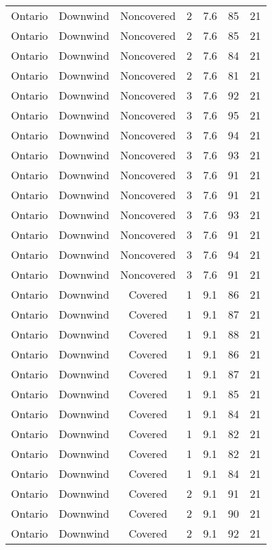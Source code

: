 \documentclass{article}
\begin{document}
\begin{longtable}[H]{ccccccc}
Ontario & Downwind & Noncovered & 2 & 7.6  & 85  & 21 \\
Ontario & Downwind & Noncovered & 2 & 7.6  & 85  & 21 \\
Ontario & Downwind & Noncovered & 2 & 7.6  & 84  & 21 \\
Ontario & Downwind & Noncovered & 2 & 7.6  & 81  & 21 \\
Ontario & Downwind & Noncovered & 3 & 7.6  & 92  & 21 \\
Ontario & Downwind & Noncovered & 3 & 7.6  & 95  & 21 \\
Ontario & Downwind & Noncovered & 3 & 7.6  & 94  & 21 \\
Ontario & Downwind & Noncovered & 3 & 7.6  & 93  & 21 \\
Ontario & Downwind & Noncovered & 3 & 7.6  & 91  & 21 \\
Ontario & Downwind & Noncovered & 3 & 7.6  & 91  & 21 \\
Ontario & Downwind & Noncovered & 3 & 7.6  & 93  & 21 \\
Ontario & Downwind & Noncovered & 3 & 7.6  & 91  & 21 \\
Ontario & Downwind & Noncovered & 3 & 7.6  & 94  & 21 \\
Ontario & Downwind & Noncovered & 3 & 7.6  & 91  & 21 \\
Ontario & Downwind & Covered     & 1 & 9.1  & 86  & 21 \\
Ontario & Downwind & Covered     & 1 & 9.1  & 87  & 21 \\
Ontario & Downwind & Covered     & 1 & 9.1  & 88  & 21 \\
Ontario & Downwind & Covered     & 1 & 9.1  & 86  & 21 \\
Ontario & Downwind & Covered     & 1 & 9.1  & 87  & 21 \\
Ontario & Downwind & Covered     & 1 & 9.1  & 85  & 21 \\
Ontario & Downwind & Covered     & 1 & 9.1  & 84  & 21 \\
Ontario & Downwind & Covered     & 1 & 9.1  & 82  & 21 \\
Ontario & Downwind & Covered     & 1 & 9.1  & 82  & 21 \\
Ontario & Downwind & Covered     & 1 & 9.1  & 84  & 21 \\
Ontario & Downwind & Covered     & 2 & 9.1  & 91  & 21 \\
Ontario & Downwind & Covered     & 2 & 9.1  & 90  & 21 \\
Ontario & Downwind & Covered     & 2 & 9.1  & 92  & 21 \\

\end{longtable}
\end{document}
